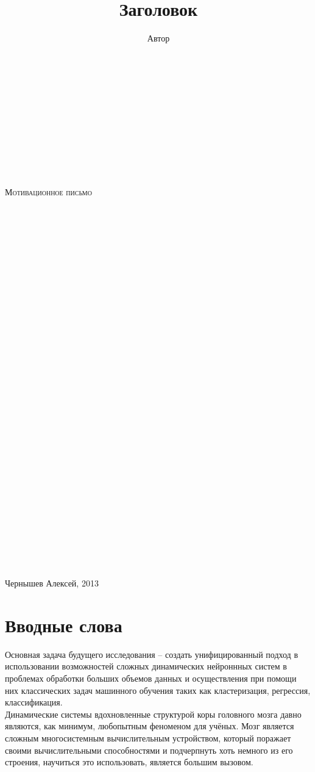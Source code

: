 \documentclass[a4paper,10pt]{article}
\title{Заголовок}
\author{Автор}
\begin{document}
\begin{center}
\thispagestyle{empty}
\centering
\ \\
\ \\
\ \\
\ \\
\ \\
\ \\
\ \\
\ \\
\ \\
\textsc{\Large Мотивационное письмо}\\[1cm]
\ \\
\ \\
\ \\
\ \\
\ \\
\ \\
\ \\
\ \\
\ \\
\ \\
\ \\
\ \\
\ \\
\ \\
\ \\
\ \\
\ \\
\ \\
\ \\
\ \\
\ \\
\ \\
\ \\
\ \\
\ \\
\ \\
\ \\
\ \\
\ \\
\ \\
\ \\
\end{center}
Чернышев Алексей, 2013

\newpage
\tableofcontents
\newpage
\setlength{\parindent}{10pt}

\section{Вводные слова}
Основная задача будущего исследования -- создать унифицированный подход в использовании возможностей сложных динамических нейроннных систем в проблемах обработки больших объемов данных и осуществления при помощи них классических задач машинного обучения таких как кластеризация, регрессия, классификация.\\
\indent Динамические системы вдохновленные структурой коры головного мозга давно являются, как минимум, любопытным феноменом для учёных. Мозг является сложным многосистемным вычислительным устройством, который поражает своими вычислительными способностями и подчерпнуть хоть немного из его строения, научиться это использовать, является большим вызовом.
\end{document}
